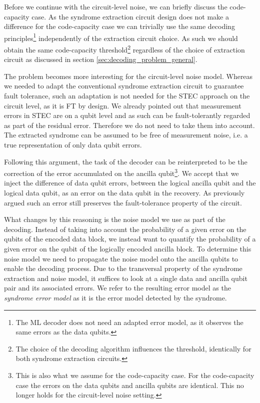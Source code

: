 Before we continue with the circuit-level noise, we can briefly discuss the code-capacity case.
As the syndrome extraction circuit design does not make a difference for the code-capacity case 
we can trivially use the same decoding principles\footnote{
    The ML decoder does not need an adapted error model, as it observes the same errors as the data qubits.
} independently of the extraction circuit choice. 
As such we should obtain the same code-capacity threshold\footnote{
    The choice of the decoding algorithm influences the threshold, identically for both syndrome extraction circuits.
    } regardless of the choice of extraction circuit as discussed in section \ref{sec:decoding_problem_general}.

The problem becomes more interesting for the circuit-level noise model.
Whereas we needed to adapt the conventional syndrome extraction circuit to guarantee fault tolerance, 
such an adaptation is not needed for the STEC approach on the circuit level, as it is FT by design. 
We already pointed out that measurement errors in STEC are on a qubit level and as such can be fault-tolerantly regarded as part of the residual error.
Therefore we do not need to take them into account.
The extracted syndrome can be assumed to be free of measurement noise, i.e. a true representation of only data qubit errors.

Following this argument, the task of the decoder can be reinterpreted to be the correction of the error accumulated on the ancilla qubit\footnote{
    This is also what we assume for the code-capacity case. 
    For the code-capacity case the errors on the data qubits and ancilla qubits are identical.
    This no longer holds for the circuit-level noise setting.
}.
We accept that we inject the difference of data qubit errors, between the logical ancilla qubit and the logical data qubit, as an error on the data qubit in the recovery.
As previously argued such an error still preserves the fault-tolerance property of the circuit. 

What changes by this reasoning is the noise model we use as part of the decoding.
Instead of taking into account the probability of a given error on the qubits of the encoded data block, 
we instead want to quantify the probability of a given error on the qubit of the logically encoded ancilla block. 
To determine this noise model we need to propagate the noise model onto the ancilla qubits to enable the decoding process. 
Due to the transversal property of the syndrome extraction and noise model, it suffices to look at a single data and ancilla qubit pair and its associated errors.
We refer to the resulting error model as the \emph{syndrome error model} as it is the error model detected by the syndrome.  

